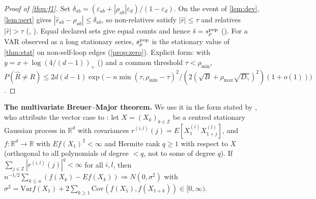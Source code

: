 \begin{proof}[Proof of \cref{thm:f1}]
Set $\delta_{ab}=(\varepsilon_{ab}+|\rho_{ab}|\varepsilon_d)/(1-\varepsilon_d)$.
On the event of \cref{lem:dev}, \cref{lem:pert} gives
$|\hat r_{ab}-\rho_{ab}|\le\delta_{ab}$, so non-relatives satisfy
$|\hat r|\le\tau$ and relatives $|\hat r|>\tau$ (,
). Equal declared sets give equal counts and hence
$\hat s=s_\rho^{\mathrm{pop}}$ (). For a VAR observed
as a long stationary series, $s_\rho^{\mathrm{pop}}$ is the stationary value
of \cref{thm:stat} on non-self-loop edges (\cref{prop:zero}). Explicit form:
with $y=x+\log(4/(d-1))_+$ () and a common threshold
$\tau<\rho_{\min}$,
$P(\hat R\ne R)\le2d(d{-}1)\exp\!\big(-n\min(\tau,\rho_{\min}-\tau)^2/(2(\sqrt B+\rho_{\max}\sqrt{D_\gamma})^2)(1+o(1))\big)$.
\end{proof}

\textbf{The multivariate Breuer--Major theorem.} We use it in the form stated
by \citet[Thm.~1.1]{nourdin2011quantitative}, who attribute the vector case to
\citet{arcones1994limit}: let $X=(X_k)_{k\in\mathbb Z}$ be a centred stationary
Gaussian process in $\mathbb R^d$ with covariances $r^{(i,l)}(j)=E[X^{(i)}_1X^{(l)}_{1+j}]$,
and $f:\mathbb R^d\to\mathbb R$ with $E f(X_1)^2<\infty$ and Hermite rank $q\ge1$
with respect to $X$ (orthogonal to all polynomials of degree $<q$, not to some of
degree $q$). If $\sum_{j\in\mathbb Z}|r^{(i,l)}(j)|^q<\infty$ for all $i,l$, then
$n^{-1/2}\sum_{k\le n}(f(X_k)-Ef(X_k))\Rightarrow N(0,\sigma^2)$ with
$\sigma^2=\mathrm{Var}f(X_1)+2\sum_{k\ge1}\mathrm{Cov}(f(X_1),f(X_{1+k}))\in[0,\infty)$.

